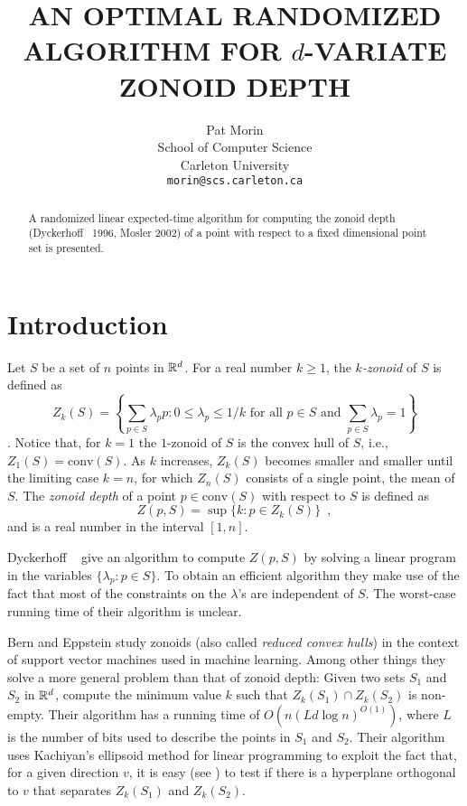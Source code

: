 \documentclass[lotsofwhite]{patmorin}
\title{\MakeUppercase{An Optimal Randomized Algorithm
	for} $d$\MakeUppercase{-Variate Zonoid Depth}}
\author{Pat Morin \\ 
	School of Computer Science \\
	Carleton University \\
	\texttt{morin@scs.carleton.ca}}
\date{}
\newcommand{\CH}{\mathrm{conv}}
\begin{document}
\maketitle
\begin{abstract}
A randomized linear expected-time algorithm for computing the zonoid
depth (Dyckerhoff \etal\ 1996, Mosler 2002) of a point with respect to a fixed
dimensional point set is presented.
\end{abstract}

\section{Introduction}

Let $S$ be a set of $n$ points in $\mathbb{R}^d$.
For a real number $k\ge 1$, the \emph{$k$-zonoid} of $S$ is defined as 
\[
      Z_k(S) = \left\{\sum_{p\in S}\lambda_p p
	: \mbox{$0\le \lambda_p \le 1/k$ for all $p\in S$  
	   and $\sum_{p\in S}\lambda_p = 1$}  \right\} 
\] 
\cite{dkm96,m02}.
Notice that, for $k=1$ the $1$-zonoid of $S$ is the convex hull of
$S$,  i.e., $Z_1(S)=\CH(S)$.
As $k$ increases, $Z_k(S)$ becomes smaller and smaller until
the limiting case $k=n$, for which $Z_n(S)$ consists of a single point,
the mean of $S$.  The \emph{zonoid depth} of a point
$p\in\CH(S)$ with respect to $S$ is defined as
\[
     Z(p,S) = \sup\{k : p\in Z_k(S) \} \enspace ,
\]
and is a real number in the interval $[1,n]$.

Dyckerhoff \etal\ \cite{dkm96} give an algorithm to compute $Z(p,S)$
by solving a linear program in the variables $\{\lambda_p:p\in S\}$.
To obtain an efficient algorithm they make use of the fact that most
of the constraints on the $\lambda$'s are independent of $S$.  The
worst-case running time of their algorithm is unclear.

Bern and Eppstein \cite{be01} study zonoids (also called \emph{reduced
convex hulls}) in the context of support vector machines used in
machine learning.  Among other things they solve a more general
problem than that of zonoid depth: Given two sets $S_1$ and $S_2$ in
$\mathbb{R}^d$, compute the minimum value $k$ such that $Z_k(S_1)\cap
Z_k(S_2)$ is non-empty.  Their algorithm has a running time of
$O(n(Ld\log n)^{O(1)})$, where $L$ is the number of bits used to
describe the points in $S_1$ and $S_2$.  Their algorithm uses
Kachiyan's ellipsoid method for linear programming \cite{k79} to
exploit the fact that, for a given direction $v$, it is easy (see
) to test if there is a hyperplane orthogonal to $v$ that
separates $Z_k(S_1)$ and $Z_k(S_2)$.
\end{document}
